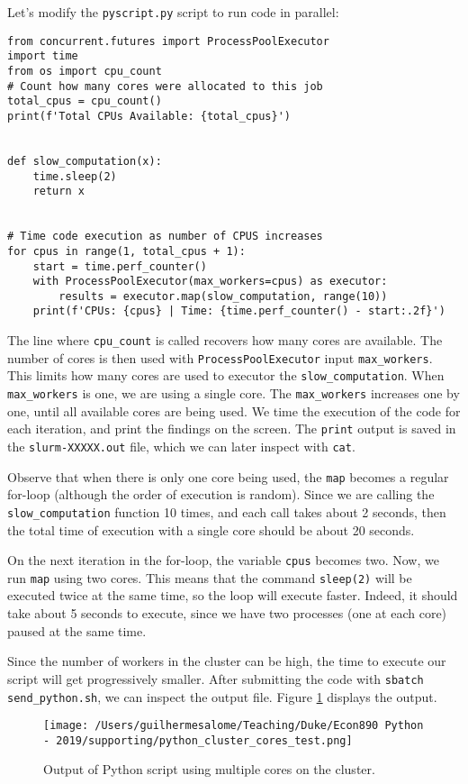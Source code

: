 \documentclass[12pt, a4paper]{article}
\begin{document}
Let's modify the \texttt{pyscript.py} script to run code in parallel:
\lstset{language=jupyter-python,label= ,caption= ,captionpos=b,numbers=none}
\begin{lstlisting}
from concurrent.futures import ProcessPoolExecutor
import time
from os import cpu_count
# Count how many cores were allocated to this job
total_cpus = cpu_count()
print(f'Total CPUs Available: {total_cpus}')


def slow_computation(x):
    time.sleep(2)
    return x


# Time code execution as number of CPUS increases
for cpus in range(1, total_cpus + 1):
    start = time.perf_counter()
    with ProcessPoolExecutor(max_workers=cpus) as executor:
        results = executor.map(slow_computation, range(10))
    print(f'CPUs: {cpus} | Time: {time.perf_counter() - start:.2f}')
\end{lstlisting}

The line where \texttt{cpu\_count} is called recovers how many cores are available.
The number of cores is then used with \texttt{ProcessPoolExecutor} input \texttt{max\_workers}.
This limits how many cores are used to executor the \texttt{slow\_computation}.
When \texttt{max\_workers} is one, we are using a single core.
The \texttt{max\_workers} increases one by one, until all available cores are being used.
We time the execution of the code for each iteration, and print the findings on the screen.
The \texttt{print} output is saved in the \texttt{slurm-XXXXX.out} file, which we can later inspect with \texttt{cat}.

Observe that when there is only one core being used, the \texttt{map} becomes a regular for-loop (although the order of execution is random).
Since we are calling the \texttt{slow\_computation} function 10 times, and each call takes about 2 seconds, then the total time of execution with a single core should be about 20 seconds.

On the next iteration in the for-loop, the variable \texttt{cpus} becomes two.
Now, we run \texttt{map} using two cores.
This means that the command \texttt{sleep(2)} will be executed twice at the same time, so the loop will execute faster.
Indeed, it should take about 5 seconds to execute, since we have two processes (one at each core) paused at the same time.

Since the number of workers in the cluster can be high, the time to execute our script will get progressively smaller.
After submitting the code with \texttt{sbatch send\_python.sh}, we can inspect the output file.
Figure \ref{fig:orga624340} displays the output.
\begin{figure}[H]
\centering
\texttt{[image: /Users/guilhermesalome/Teaching/Duke/Econ890 Python - 2019/supporting/python\_cluster\_cores\_test.png]}
\caption{\label{fig:orga624340}
Output of Python script using multiple cores on the cluster.}
\end{figure}
\end{document}
